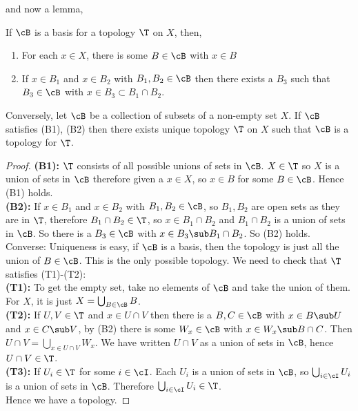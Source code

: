 and now a lemma,
\begin{nlemma}
  If $\cB$ is a basis for a topology $\T$ on $X$, then,
  \begin{enumerate}
    \item For each $x \in X$, there is some $B \in \cB$ with $x \in B$
    \item If $x \in B_1$ and $x \in B_2$ with $B_1, B_2 \in \cB$ then there exists a $B_3$ such that $B_3 \in \cB$ with $x \in B_3 \subset B_1 \cap B_2$.
  \end{enumerate}
  Conversely, let $\cB$ be a collection of subsets of a non-empty set $X$. If $\cB$ satisfies (B1), (B2) then there exists unique topology $\T$ on $X$ such that $\cB$ is a topology for $\T$.
\end{nlemma}
\begin{proof}
  \textbf{(B1):} $\T$ consists of all possible unions of sets in $\cB$. $X \in \T$ so $X$ is a union of sets in $\cB$ therefore given a $x \in X$, so $x \in B$ for some $B \in \cB$. Hence (B1) holds.\\

  \noindent
  \textbf{(B2):} If $x \in B_1$ and $x \in B_2$ with $B_1, B_2 \in \cB$, so $B_1, B_2$ are open sets as they are in $\T$, therefore $B_1 \cap B_2 \in \T$, so $x \in B_1\cap B_2$ and $B_1\cap B_2$ is a union of sets in $\cB$. So there is a $B_3 \in \cB$ with $x \in B_3 \sub B_1 \cap B_2$. So (B2) holds.\\

  \noindent
  Converse: Uniqueness is easy, if $\cB$ is a basis, then the topology is just all the union of $B \in \cB$. This is the only possible topology. We need to check that $\T$ satisfies (T1)-(T2):\\

  \noindent
  \textbf{(T1):} To get the empty set, take no elements of $\cB$ and take the union of them. For $X$, it is just $X = \bigcup_{B \in \cB} B$.\\

  \noindent
  \textbf{(T2):} If $U, V \in \T$ and $x \in U\cap V$ then there is a $B, C \in \cB$ with $x \in B \sub U$ and $x \in C \sub V$, by (B2) there is some $W_x \in \cB$ with $x \in W_x \sub B \cap C$. Then $U \cap V = \bigcup_{x \in U \cap V} W_x$. We have written $U \cap V$ as a union of sets in $\cB$, hence $U \cap V \in \T$.\\

  \noindent
  \textbf{(T3):} If $U_i \in \T$ for some $i \in \cI$. Each $U_i$ is a union of sets in $\cB$, so $\bigcup_{i \in \cI} U_i$ is a union of sets in $\cB$. Therefore $\bigcup_{i \in \cI}U_i \in \T$.\\

  \noindent
  Hence we have a topology.
\end{proof}